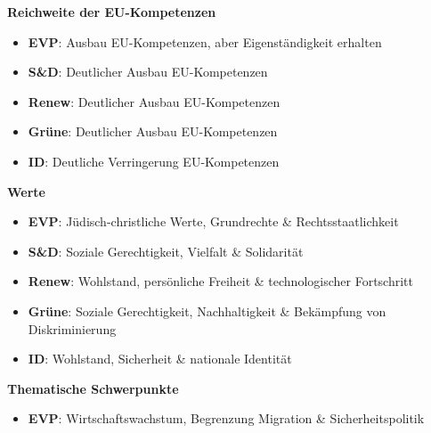 \documentclass[11pt]{article}
\newcommand{\logoOne}{Logos/jef.png}
\newcommand{\logoTwo}{Logos/simep.png}
\begin{document}
\newpage


\vspace*{1cm}

\begin{minipage}[t]{0.45\textwidth}
    \textbf{\Large Reichweite der EU-Kompetenzen}
    \raggedright
    \begin{itemize}
        \item \textbf{EVP}: {\small Ausbau EU-Kompetenzen, aber Eigenständigkeit erhalten}
        \item \textbf{S\&D}: {\small Deutlicher Ausbau EU-Kompetenzen}
        \item \textbf{Renew}: {\small Deutlicher Ausbau EU-Kompetenzen}
        \item \textbf{Grüne}: {\small Deutlicher Ausbau EU-Kompetenzen}
        \item \textbf{ID}: {\small Deutliche Verringerung EU-Kompetenzen}
    \end{itemize}
    \textbf{\Large Werte}
    \raggedright
    \begin{itemize}
        \item \textbf{EVP}: {\small Jüdisch-christliche Werte, Grundrechte \& Rechtsstaatlichkeit}
        \item \textbf{S\&D}: {\small Soziale Gerechtigkeit, Vielfalt \& Solidarität}
        \item \textbf{Renew}: {\small Wohlstand, persönliche Freiheit \& technologischer Fortschritt}
        \item \textbf{Grüne}: {\small Soziale Gerechtigkeit, Nachhaltigkeit \& Bekämpfung von Diskriminierung}
        \item \textbf{ID}: {\small Wohlstand, Sicherheit \& nationale Identität}
    \end{itemize}
    \textbf{\Large Thematische Schwerpunkte}
    \raggedright
    \begin{itemize}
        \item \textbf{EVP}: {\small Wirtschaftswachstum, Begrenzung Migration \& Sicherheitspolitik}

\end{itemize}
\end{minipage}
\end{document}
